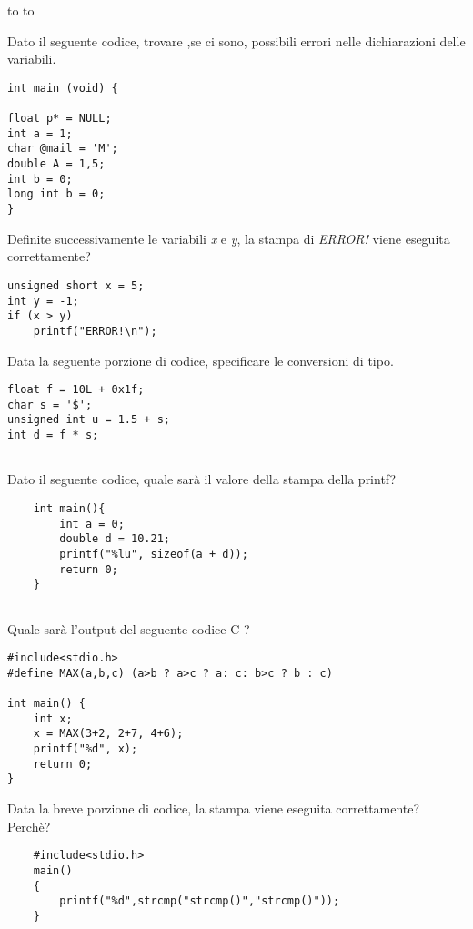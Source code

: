 \documentclass[a4paper,12pt] {exam}
\begin{document}
\begin{center}
\end{center}
\vspace{0.1in}
\hbox to \textwidth{Nome e Cognome:\enspace\hrulefill}
\hbox to \textwidth{Matricola:\enspace\hrulefill}
\begin{questions}

\question {} Dato il seguente codice, trovare ,se ci sono, possibili errori nelle dichiarazioni delle variabili.
\vspace{0.1in}
\begin{lstlisting}
int main (void) {

float p* = NULL;
int a = 1;
char @mail = 'M';
double A = 1,5;
int b = 0;
long int b = 0;
}
\end{lstlisting}


\question {} Definite successivamente le variabili \textit{x} e \textit{y}, la stampa di \textit{ERROR!} viene eseguita correttamente?
\vspace{0.1in}
\begin{lstlisting}
unsigned short x = 5;
int y = -1;
if (x > y)
	printf("ERROR!\n");
\end{lstlisting}

\question {} Data la seguente porzione di codice, specificare le conversioni di tipo.
\begin{lstlisting}
float f = 10L + 0x1f;
char s = '$';
unsigned int u = 1.5 + s;
int d = f * s;
	
\end{lstlisting}

\question {} Dato il seguente codice, quale sarà il valore della stampa della printf?
\begin{lstlisting}
	int main(){
		int a = 0;
		double d = 10.21;
		printf("%lu", sizeof(a + d));
		return 0;
	}
	
\end{lstlisting}
\pagebreak
\question {} Quale sarà l'output del seguente codice C ?
\begin{lstlisting}
#include<stdio.h>
#define MAX(a,b,c) (a>b ? a>c ? a: c: b>c ? b : c)
	
int main() {
	int x;
	x = MAX(3+2, 2+7, 4+6);
	printf("%d", x);
	return 0;
}
\end{lstlisting}

\question {} Data la breve porzione di codice, la stampa viene eseguita correttamente? Perchè?
\begin{lstlisting}
	#include<stdio.h>
	main()
	{
		printf("%d",strcmp("strcmp()","strcmp()"));
	}
\end{lstlisting}


\end{questions}
\end{document}
